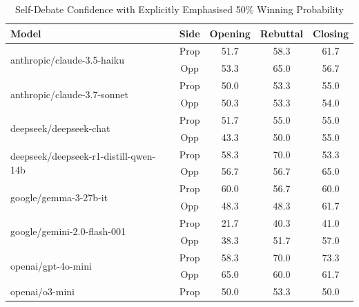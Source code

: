 \documentclass{article}
\begin{document}


\begin{table}[htbp]
  \centering
  \caption{Self-Debate Confidence with Explicitly Emphasised 50\% Winning Probability}
  \label{tab:self-debate-informed}
  \begin{tabular}{l|c|ccc}
      \toprule
      \textbf{Model} & \textbf{Side} & \textbf{Opening} & \textbf{Rebuttal} & \textbf{Closing} \\
      \midrule
      \multirow{2}{*}{anthropic/claude-3.5-haiku} & Prop & 51.7 & 58.3 & 61.7 \\
       & Opp & 53.3 & 65.0 & 56.7 \\
      \midrule
      \multirow{2}{*}{anthropic/claude-3.7-sonnet} & Prop & 50.0 & 53.3 & 55.0 \\
       & Opp & 50.3 & 53.3 & 54.0 \\
      \midrule
      \multirow{2}{*}{deepseek/deepseek-chat} & Prop & 51.7 & 55.0 & 55.0 \\
       & Opp & 43.3 & 50.0 & 55.0 \\
      \midrule
      \multirow{2}{*}{deepseek/deepseek-r1-distill-qwen-14b} & Prop & 58.3 & 70.0 & 53.3 \\
       & Opp & 56.7 & 56.7 & 65.0 \\
      \midrule
      \multirow{2}{*}{google/gemma-3-27b-it} & Prop & 60.0 & 56.7 & 60.0 \\
       & Opp & 48.3 & 48.3 & 61.7 \\
      \midrule
      \multirow{2}{*}{google/gemini-2.0-flash-001} & Prop & 21.7 & 40.3 & 41.0 \\
       & Opp & 38.3 & 51.7 & 57.0 \\
      \midrule
      \multirow{2}{*}{openai/gpt-4o-mini} & Prop & 58.3 & 70.0 & 73.3 \\
       & Opp & 65.0 & 60.0 & 61.7 \\
      \midrule
      \multirow{2}{*}{openai/o3-mini} & Prop & 50.0 & 53.3 & 50.0 \\

\end{tabular}
\end{table}
\end{document}
